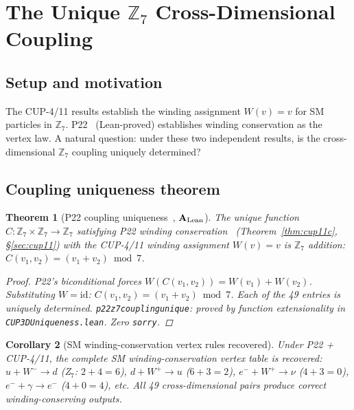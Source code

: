 \documentclass[11pt]{article}
\newtheorem{theorem}{Theorem}[section]
\newtheorem{corollary}[theorem]{Corollary}
\theoremstyle{remark}
\newcommand{\lean}[1]{%
  \penalty-100
  \begingroup\def\_{\textunderscore\allowbreak}\texttt{#1}\endgroup}
\newcommand{\CatAL}{\ensuremath{\textbf{A}_{\rm Lean}}}
\begin{document}
\section{The Unique $\mathbb{Z}_7$ Cross-Dimensional Coupling}
\label{sec:cup3d_coupling}

\subsection{Setup and motivation}

The CUP-4/11 results establish the winding assignment $W(v) = v$ for SM particles in $\mathbb{Z}_7$.
P22~\cite{Spivack2026_UGPDynamics} (Lean-proved) establishes winding conservation as the vertex law.
A natural question: under these two independent results, is the cross-dimensional
$\mathbb{Z}_7$ coupling uniquely determined?

\subsection{Coupling uniqueness theorem}

\begin{theorem}[P22 coupling uniqueness~\cite{Spivack2026_UGPDynamics}, $\CatAL$]
\label{thm:coupling_unique}
The unique function $C:\mathbb{Z}_7 \times \mathbb{Z}_7 \to \mathbb{Z}_7$ satisfying
P22 winding conservation~\cite{Spivack2026_UGPDynamics} (Theorem~\ref{thm:cup11c}, \S\ref{sec:cup11}) with the
CUP-4/11 winding assignment $W(v) = v$ is $\mathbb{Z}_7$ addition:
$C(v_1, v_2) = (v_1 + v_2) \bmod 7$.
\begin{proof}
P22's biconditional forces $W(C(v_1,v_2)) = W(v_1) + W(v_2)$.
Substituting $W = \mathrm{id}$: $C(v_1,v_2) = (v_1 + v_2) \bmod 7$.
Each of the 49 entries is uniquely determined.
\lean{p22\_z7\_coupling\_unique}: proved by function extensionality in \lean{CUP3DUniqueness.lean}.
Zero \texttt{sorry}.
\end{proof}
\end{theorem}

\begin{corollary}[SM winding-conservation vertex rules recovered]
Under P22 + CUP-4/11, the complete SM winding-conservation vertex table is recovered:
$u + W^- \to d$ (Z$_7$: $2+4=6$), $d + W^+ \to u$ ($6+3=2$),
$e^- + W^+ \to \nu$ ($4+3=0$), $e^- + \gamma \to e^-$ ($4+0=4$), etc.
All 49 cross-dimensional pairs produce correct winding-conserving outputs.
\end{corollary}
\end{document}
